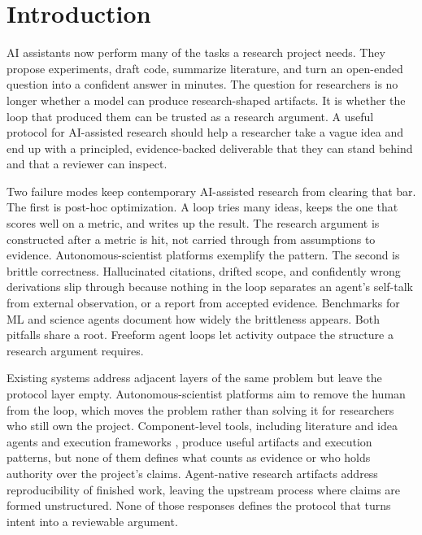 \section{Introduction}
\label{sec:intro}

AI assistants now perform many of the tasks a research project needs. They propose experiments, draft code, summarize literature, and turn an open-ended question into a confident answer in minutes. The question for researchers is no longer whether a model can produce research-shaped artifacts. It is whether the loop that produced them can be trusted as a research argument. A useful protocol for AI-assisted research should help a researcher take a vague idea and end up with a principled, evidence-backed deliverable that they can stand behind and that a reviewer can inspect.

Two failure modes keep contemporary AI-assisted research from clearing that bar. The first is post-hoc optimization. A loop tries many ideas, keeps the one that scores well on a metric, and writes up the result. The research argument is constructed after a metric is hit, not carried through from assumptions to evidence. Autonomous-scientist platforms \citep{lu2024aiscientist, gottweis2025aicoscientist} exemplify the pattern. The second is brittle correctness. Hallucinated citations, drifted scope, and confidently wrong derivations slip through because nothing in the loop separates an agent's self-talk from external observation, or a report from accepted evidence. Benchmarks for ML and science agents \citep{chan2024mlebench, chen2024scienceagentbench} document how widely the brittleness appears. Both pitfalls share a root. Freeform agent loops let activity outpace the structure a research argument requires.

Existing systems address adjacent layers of the same problem but leave the protocol layer empty. Autonomous-scientist platforms aim to remove the human from the loop, which moves the problem rather than solving it for researchers who still own the project. Component-level tools, including literature and idea agents \citep{baek2024researchagent, skarlinski2024paperqa} and execution frameworks \citep{yao2023react, wu2023autogen, jiang2025aide}, produce useful artifacts and execution patterns, but none of them defines what counts as evidence or who holds authority over the project's claims. Agent-native research artifacts \citep{liu2026ara} address reproducibility of finished work, leaving the upstream process where claims are formed unstructured. None of those responses defines the protocol that turns intent into a reviewable argument.


